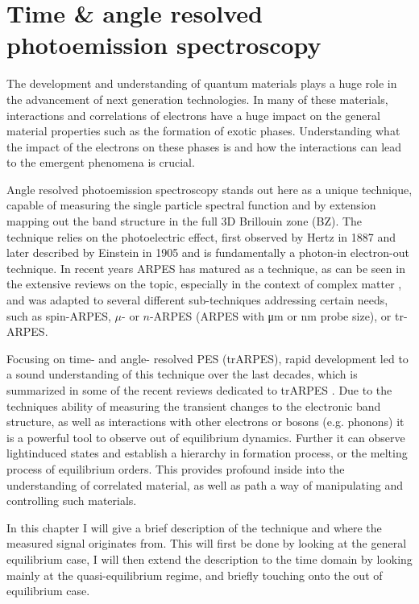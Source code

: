\chapter{Time \& angle resolved photoemission spectroscopy}

The development and understanding of quantum materials plays a huge role in the advancement of next generation technologies.
In many of these materials, interactions and correlations of electrons have a huge impact on the general material properties such as the formation of exotic phases.
Understanding what the impact of the electrons on these phases is and how the interactions can lead to the emergent phenomena is crucial.

Angle resolved photoemission spectroscopy stands out here as a unique technique, capable of measuring the single particle spectral function and by extension mapping out the band structure in the full 3D Brillouin zone (BZ).
The technique relies on the photoelectric effect, first observed by Hertz in 1887 \cite{hertz_ueber_1887} and later described by Einstein in 1905 \cite{einstein_uber_1905} and is fundamentally a photon-in electron-out technique.
In recent years ARPES has matured as a technique, as can be seen in the extensive reviews on the topic, especially in the context of complex matter \cite{damascelli_angle-resolved_2003,damascelli_angle-resolved_2003,lu_angle-resolved_2012,gedik_photoemission_2017,lv_angle-resolved_2019,zhang_angle-resolved_2022}, and was adapted to several different sub-techniques addressing certain needs, such as spin-ARPES, $\mu$- or $n$-ARPES (ARPES with \unit{\micro\meter} or \unit{\nano\meter} probe size), or tr-ARPES.

Focusing on time- and angle- resolved PES (trARPES), rapid development led to a sound understanding of this technique over the last decades, which is summarized in some of the recent reviews dedicated to trARPES \cite{smallwood_ultrafast_2016,huang_high-resolution_2022,boschini_time-resolved_2024}.
Due to the techniques ability of measuring the transient changes to the electronic band structure, as well as interactions with other electrons or bosons (e.g. phonons) it is a powerful tool to observe out of equilibrium dynamics.
Further it can observe lightinduced states and establish a hierarchy in formation process, or the melting process of equilibrium orders.
This provides profound inside into the understanding of correlated material, as well as path a way of manipulating and controlling such materials.

In this chapter I will give a brief description of the technique and where the measured signal originates from.
This will first be done by looking at the general equilibrium case, I will then extend the description to the time domain by looking mainly at the quasi-equilibrium regime, and briefly touching onto the out of equilibrium case.

